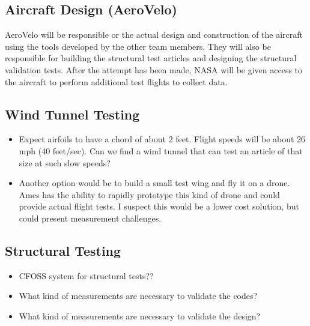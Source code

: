 \documentclass[]{aiaa-tc}
\begin{document}
    \subsection{Aircraft Design (AeroVelo)}

    AeroVelo will be responsible or the actual design and construction of the aircraft using the tools developed 
    by the other team members. They will also be responsible for building the structural test articles and designing 
    the structural validation tests. After the attempt has been made, NASA will be given access to 
    the aircraft to perform additional test flights to collect data. 

    \subsection{Wind Tunnel Testing}
        \begin{itemize}
            \item Expect airfoils to have a chord of about 2 feet. Flight speeds will be about 26 mph (40 feet/sec). Can we find a wind tunnel 
            that can test an article of that size at such slow speeds? 
            \item Another option would be to build a small test wing and fly it on a drone. Ames has the ability to rapidly prototype this kind 
            of drone and could provide actual flight tests. I suspect this would be a lower cost solution, but could 
            present measurement challenges. 
        \end{itemize}

    \subsection{Structural Testing}
        \begin{itemize}
            \item CFOSS system for structural tests?? 
            \item What kind of measurements are necessary to validate the codes? 
            \item What kind of measurements are necessary to validate the design? 
        \end{itemize}
\end{document}
